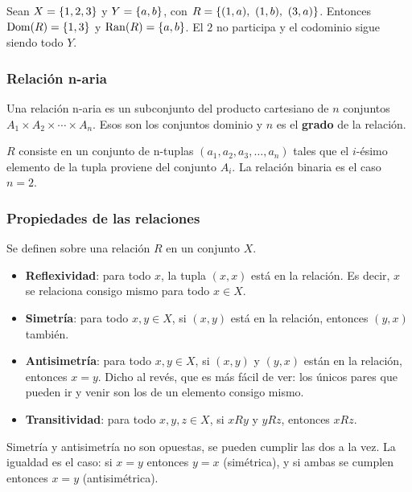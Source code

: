 \documentclass[11pt,letterpaper]{article}
\begin{document}
\begin{ejemplo}
    Sean $X = \left\{ 1, 2, 3 \right\}$ y $Y = \left\{ a, b \right\}$, con
    $R = \left\{ (1,a),\ (1,b),\ (3,a) \right\}$. Entonces
    $\mathrm{Dom}(R) = \left\{ 1, 3 \right\}$ y $\mathrm{Ran}(R) = \left\{ a, b \right\}$.
    El $2$ no participa y el codominio sigue siendo todo $Y$.
\end{ejemplo}

\subsubsection*{Relación n-aria}

Una relación n-aria es un subconjunto del producto cartesiano de $n$
conjuntos $A_1 \times A_2 \times \cdots \times A_n$. Esos son los
conjuntos dominio y $n$ es el \textbf{grado} de la relación.

$R$ consiste en un conjunto de n-tuplas $(a_1, a_2, a_3, \ldots, a_n)$
tales que el $i$-ésimo elemento de la tupla proviene del conjunto
$A_i$. La relación binaria es el caso $n = 2$.

\subsubsection*{Propiedades de las relaciones}

Se definen sobre una relación $R$ en un conjunto $X$.

\begin{itemize}[itemsep=0.2em]
    \item \textbf{Reflexividad}: para todo $x$, la tupla $(x,x)$ está
          en la relación. Es decir, $x$ se relaciona consigo mismo
          para todo $x \in X$.
    \item \textbf{Simetría}: para todo $x, y \in X$, si $(x,y)$ está
          en la relación, entonces $(y,x)$ también.
    \item \textbf{Antisimetría}: para todo $x, y \in X$, si $(x,y)$ y
          $(y,x)$ están en la relación, entonces $x = y$. Dicho al
          revés, que es más fácil de ver: los únicos pares que pueden
          ir y venir son los de un elemento consigo mismo.
    \item \textbf{Transitividad}: para todo $x, y, z \in X$, si $xRy$
          y $yRz$, entonces $xRz$.
\end{itemize}

\begin{ojo}
    Simetría y antisimetría no son opuestas, se pueden cumplir las dos
    a la vez. La igualdad es el caso: si $x = y$ entonces $y = x$
    (simétrica), y si ambas se cumplen entonces $x = y$
    (antisimétrica).
\end{ojo}
\end{document}
